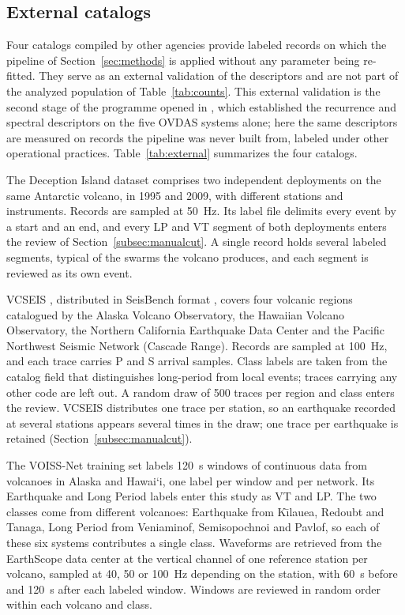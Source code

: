 \documentclass[pdflatex,sn-mathphys-num]{sn-jnl}
\begin{document}
\subsection{External catalogs}\label{subsec:external}

Four catalogs compiled by other agencies provide labeled records on which the
pipeline of Section~\ref{sec:methods} is applied without any parameter being
re-fitted. They serve as an external validation of the descriptors and are
not part of the analyzed population of Table~\ref{tab:counts}. This external
validation is the second stage of the programme opened in
\cite{morales_recurrence_2026}, which established the recurrence and spectral
descriptors on the five OVDAS systems alone; here the same descriptors are
measured on records the pipeline was never built from, labeled under other
operational practices. Table~\ref{tab:external} summarizes the four catalogs.

The Deception Island dataset \cite{cortes_standardization_2019} comprises two
independent deployments on the same Antarctic volcano, in 1995 and 2009, with
different stations and instruments. Records are sampled at 50~Hz. Its label
file delimits every event by a start and an end, and every LP and VT segment
of both deployments enters the review of Section~\ref{subsec:manualcut}. A
single record holds several labeled segments, typical of the swarms the
volcano produces, and each segment is reviewed as its own event.

VCSEIS \cite{zhong_deep-learning-based_2024}, distributed in SeisBench format
\cite{woollam_seisbench_2022}, covers four volcanic regions catalogued by the
Alaska Volcano Observatory, the Hawaiian Volcano Observatory, the Northern
California Earthquake Data Center and the Pacific Northwest Seismic Network
(Cascade Range). Records are sampled at 100~Hz, and each trace carries P and S
arrival samples. Class labels are taken from the catalog field that
distinguishes long-period from local events; traces carrying any other code
are left out. A random draw of 500 traces per region and class enters the
review. VCSEIS distributes one trace per station, so an earthquake recorded
at several stations appears several times in the draw; one trace per
earthquake is retained (Section~\ref{subsec:manualcut}).

The VOISS-Net training set \cite{fee_generalized_2025} labels 120~s windows
of continuous data from volcanoes in Alaska and Hawai`i, one label per window
and per network. Its Earthquake and Long Period labels enter this study as VT
and LP. The two classes come from different volcanoes: Earthquake from
K\={\i}lauea, Redoubt and Tanaga, Long Period from Veniaminof, Semisopochnoi
and Pavlof, so each of these six systems contributes a single class.
Waveforms are retrieved from the EarthScope data center at the vertical
channel of one reference station per volcano, sampled at 40, 50 or 100~Hz
depending on the station, with 60~s before and 120~s after each labeled
window. Windows are reviewed in random order within each volcano and class.
\end{document}

